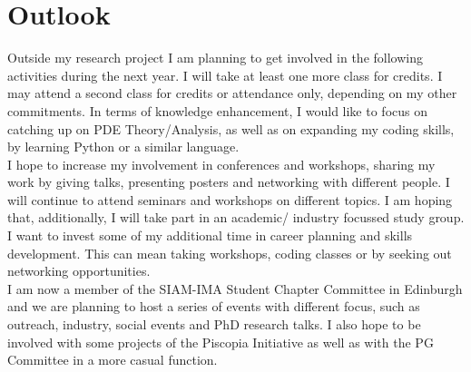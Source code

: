 \documentclass[11pt, a4paper]{article}
\theoremstyle{definition}
\begin{document}
\section{Outlook}
Outside my research project I am planning to get involved in the following activities during the next year.
I will take at least one more class for credits. I may attend a second class for credits or attendance only, depending on my other commitments. In terms of knowledge enhancement, I would like to focus on catching up on PDE Theory/Analysis, as well as on expanding my coding skills, by learning Python or a similar language.\\
I hope to increase my involvement in conferences and workshops, sharing my work by giving talks, presenting posters and networking with different people. I will continue to attend seminars and workshops on different topics. I am hoping that, additionally, I will take part in an academic/ industry focussed study group.\\
I want to invest some of my additional time in career planning and skills development. This can mean taking workshops, coding classes or by seeking out networking opportunities.\\ 	
I am now a member of the SIAM-IMA Student Chapter Committee in Edinburgh and we are planning to host a series of events with different focus, such as outreach, industry, social events and PhD research talks. 
I also hope to be involved with some projects of the Piscopia Initiative as well as with the PG Committee in a more casual function. \\


 

	
	
\end{document}
